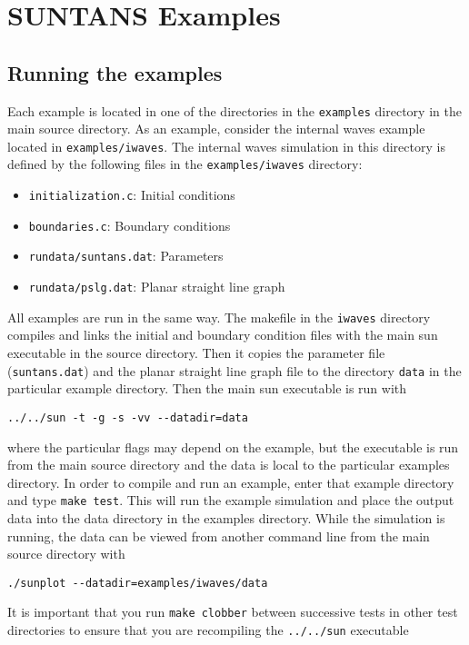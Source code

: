 \section{SUNTANS Examples} \label{sec:examples}

\subsection{Running the examples}

Each example is located in one of the directories in the \verb+examples+ directory in
the main source directory.  As an example, consider the internal waves example located
in \verb+examples/iwaves+.  The internal waves simulation in this directory is defined by the following files
in the \verb+examples/iwaves+ directory:
\begin{itemize}
\item \verb+initialization.c+: Initial conditions
\item \verb+boundaries.c+: Boundary conditions
\item \verb+rundata/suntans.dat+: Parameters
\item \verb+rundata/pslg.dat+: Planar straight line graph
\end{itemize}
All examples are run in the same way.
The makefile in the \verb+iwaves+ directory compiles and links the initial and boundary condition
files with the main sun executable in the source directory.  Then it copies the parameter
file (\verb+suntans.dat+) and the planar straight line graph file to the directory \verb+data+ in
the particular example directory.  Then the main sun executable is run with
\begin{verbatim}
../../sun -t -g -s -vv --datadir=data
\end{verbatim}
where the particular flags may depend on the example, but the executable is run from
the main source directory and the data is local to the particular examples directory.
In order to compile and run an example, enter that example
directory and type \verb+make test+.  This will run the example simulation and place
the output data into the data directory in the examples directory.
While the simulation is running, the data can be viewed from another command line
from the main source directory with
\begin{verbatim}
./sunplot --datadir=examples/iwaves/data
\end{verbatim}
It is important that you run \verb+make clobber+ between successive tests in other
test directories to ensure that you are recompiling the \verb+../../sun+ executable
